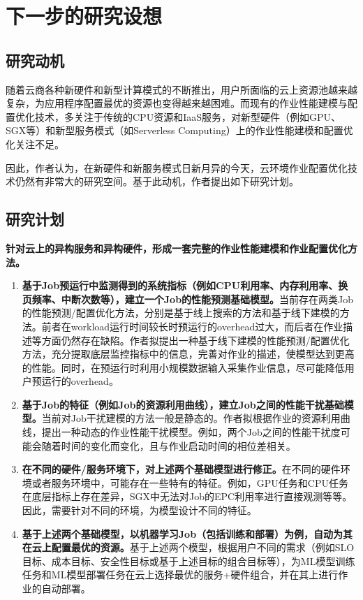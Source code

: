 \chapter{下一步的研究设想}

\section{研究动机}
随着云商各种新硬件和新型计算模式的不断推出，用户所面临的云上资源池越来越复杂，为应用程序配置最优的资源也变得越来越困难。而现有的作业性能建模与配置优化技术，多关注于传统的CPU资源和IaaS服务，对新型硬件（例如GPU、SGX等）和新型服务模式（如Serverless Computing）上的作业性能建模和配置优化关注不足。

因此，作者认为，在新硬件和新服务模式日新月异的今天，云环境作业配置优化技术仍然有非常大的研究空间。基于此动机，作者提出如下研究计划。

\section{研究计划}

\textbf{针对云上的异构服务和异构硬件，形成一套完整的作业性能建模和作业配置优化方法。}
\begin{enumerate}
    \item \textbf{基于Job预运行中监测得到的系统指标（例如CPU利用率、内存利用率、换页频率、中断次数等），建立一个Job的性能预测基础模型。}当前存在两类Job的性能预测/配置优化方法，分别是基于线上搜索的方法和基于线下建模的方法。前者在workload运行时间较长时预运行的overhead过大，而后者在作业描述等方面仍然存在缺陷。作者拟提出一种基于线下建模的性能预测/配置优化方法，充分提取底层监控指标中的信息，完善对作业的描述，使模型达到更高的性能。同时，在预运行时利用小规模数据输入采集作业信息，尽可能降低用户预运行的overhead。
    \item \textbf{基于Job的特征（例如Job的资源利用曲线），建立Job之间的性能干扰基础模型。}当前对Job干扰建模的方法一般是静态的。作者拟根据作业的资源利用曲线，提出一种动态的作业性能干扰模型。例如，两个Job之间的性能干扰度可能会随着时间的变化而变化，且与作业启动时间的相位差相关。
    \item \textbf{在不同的硬件/服务环境下，对上述两个基础模型进行修正。}在不同的硬件环境或者服务环境中，可能存在一些特有的特征。例如，GPU任务和CPU任务在底层指标上存在差异，SGX中无法对Job的EPC利用率进行直接观测等等。因此，需要针对不同的环境，为模型设计不同的特征。
    \item \textbf{基于上述两个基础模型，以机器学习Job（包括训练和部署）为例，自动为其在云上配置最优的资源。}基于上述两个模型，根据用户不同的需求（例如SLO目标、成本目标、安全性目标或基于上述目标的组合目标等），为ML模型训练任务和ML模型部署任务在云上选择最优的服务+硬件组合，并在其上进行作业的自动部署。
\end{enumerate}

